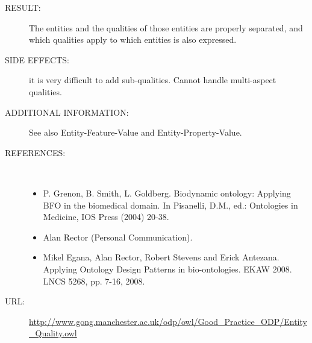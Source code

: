 \begin{description}
\item [RESULT:] The entities and the qualities of those entities are properly separated, and which qualities apply to which entities is also expressed.

\item [SIDE EFFECTS:] it is very difficult to add sub-qualities. Cannot handle multi-aspect qualities.

\item [ADDITIONAL INFORMATION:] See also Entity-Feature-Value and Entity-Property-Value.

\item [REFERENCES: ] ~\begin{itemize}
\item P. Grenon, B. Smith, L. Goldberg. Biodynamic ontology: Applying BFO in the biomedical domain. In Pisanelli, D.M., ed.: Ontologies in Medicine, IOS Press
(2004) 20-38.
\item Alan Rector (Personal Communication).
\item Mikel Egana, Alan Rector, Robert Stevens and Erick Antezana. Applying Ontology Design Patterns in bio-ontologies. EKAW 2008. LNCS 5268, pp. 7-16, 2008.\end{itemize}
\item [URL: ] \url{http://www.gong.manchester.ac.uk/odp/owl/Good_Practice_ODP/Entity_Quality.owl} \end{description}